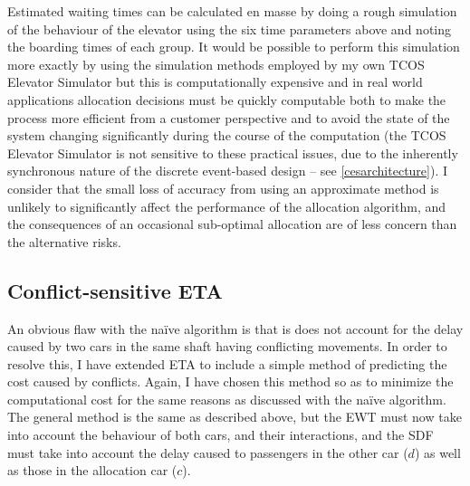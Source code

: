 \documentclass{UoYCSproject}
\begin{document}
Estimated waiting times can be calculated en masse by doing a rough simulation of the behaviour of the elevator using the six time parameters above and noting the boarding times of each group.  It would be possible to perform this simulation more exactly by using the simulation methods employed by my own TCOS Elevator Simulator but this is computationally expensive and in real world applications allocation decisions must be quickly computable both to make the process more efficient from a customer perspective and to avoid the state of the system changing significantly during the course of the computation (the TCOS Elevator Simulator is not sensitive to these practical issues, due to the inherently synchronous nature of the discrete event-based design -- see \autoref{cesarchitecture}).  I consider that the small loss of accuracy from using an approximate method is unlikely to significantly affect the performance of the allocation algorithm, and the consequences of an occasional sub-optimal allocation are of less concern than the alternative risks.

\subsection{Conflict-sensitive ETA}
\label{algETAconflict}

An obvious flaw with the na\"{i}ve algorithm is that is does not account for the delay caused by two cars in the same shaft having conflicting movements.  In order to resolve this, I have extended ETA to include a simple method of predicting the cost caused by conflicts.  Again, I have chosen this method so as to minimize the computational cost for the same reasons as discussed with the na\"{i}ve algorithm.  The general method is the same as described above, but the EWT must now take into account the behaviour of both cars, and their interactions, and the SDF must take into account the delay caused to passengers in the other car ($d$) as well as those in the allocation car ($c$).
\end{document}
